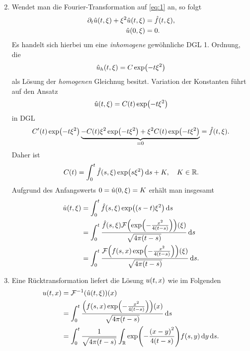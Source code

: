 \documentclass{exercise}
\begin{document}
\begin{enumerate}
\[        \]
        \item Wendet man die Fourier-Transformation auf \eqref{eq:1} an, so folgt
        \begin{align*}
            \partial_t\hat{u}\parentheses*{t, \xi} + \xi^2 \hat{u}\parentheses*{t, \xi} &= \hat{f}\parentheses*{t, \xi},\\
            \hat{u}\parentheses*{0, \xi} &= 0.
        \end{align*}
        Es handelt sich hierbei um eine \emph{inhomogene} gewöhnliche DGL 1. Ordnung, die
        \[
            \hat{u}_h\parentheses*{t, \xi} = C\exp\parentheses*{-t\xi^2}
        \]
        als Lösung der \emph{homogenen} Gleichnug besitzt.
        Variation der Konstanten führt auf den Ansatz
        \[
            \hat{u}\parentheses*{t, \xi} = C\parentheses*{t}\exp\parentheses*{-t\xi^2}
        \]
        in DGL
        \[
            C'\parentheses*{t}\exp\parentheses*{-t\xi^2} \underbrace{- C\parentheses*{t}\xi^2 \exp\parentheses*{-t\xi^2} + \xi^2 C\parentheses*{t}\exp\parentheses*{-t\xi^2}}_{= 0} = \hat{f}\parentheses*{t, \xi}.
        \]
        Daher ist
        \[
            C\parentheses*{t} = \int_0^t \hat{f}\parentheses*{s, \xi}\exp\parentheses*{s\xi^2}\d s + K, \quad K \in \R.
        \]
        Aufgrund des Anfangswerts \(0 = \hat{u}\parentheses*{0, \xi} = K\) erhält man insgesamt
        \begin{align*}
            \hat{u}\parentheses*{t, \xi} &= \int_0^t \hat{f}\parentheses*{s, \xi}\exp\parentheses*{\parentheses*{s - t}\xi^2}\d s\\
            &= \int_0^t \frac{\hat{f}\parentheses*{s, \xi}\mathcal{F}\parentheses*{\exp\parentheses*{-\frac{x^2}{4\parentheses*{t - s}}}}\parentheses*{\xi}}{\sqrt{4\pi\parentheses*{t - s}}}\d s\\
            &= \int_0^t \frac{\mathcal{F}\parentheses*{f\parentheses*{s, x}\exp\parentheses*{-\frac{x^2}{4\parentheses*{t - s}}}}\parentheses*{\xi}}{\sqrt{4\pi\parentheses*{t - s}}}\d s.
        \end{align*}
        \item Eine Rücktransformation liefert die Lösung \(u\parentheses*{t, x}\) wie im Folgenden
        \begin{align*}
            u\parentheses*{t, x} &= \mathcal{F}^{-1}\parentheses*{\hat{u}\parentheses*{t, \xi}}\parentheses*{x}\\
            &= \int_0^t \frac{\parentheses*{f\parentheses*{s, x}\exp\parentheses*{-\frac{x^2}{4\parentheses*{t - s}}}}\parentheses*{x}}{\sqrt{4\pi\parentheses*{t - s}}}\d s\\
            &= \int_0^t \frac{1}{\sqrt{4\pi\parentheses*{t - s}}}\int_\R \exp\parentheses*{-\frac{\parentheses*{x - y}^2}{4\parentheses*{t - s}}}f\parentheses*{s, y}\d y\d s.
        \end{align*}
    \end{enumerate}
\end{document}
